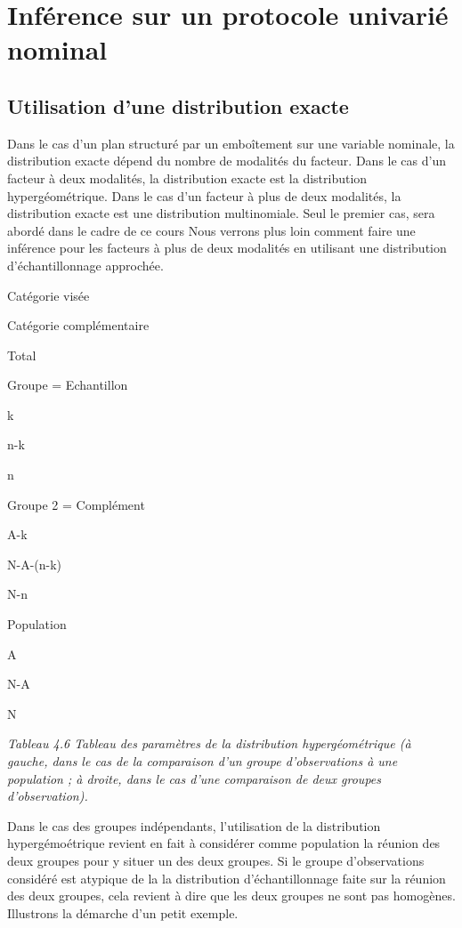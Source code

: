 \documentclass[]{book}
\theoremstyle{definition}
\theoremstyle{definition}
\theoremstyle{definition}
\theoremstyle{remark}
\begin{document}
\hypertarget{inference-sur-un-protocole-univarie-nominal-1}{%
\section{Inférence sur un protocole univarié
nominal}\label{inference-sur-un-protocole-univarie-nominal-1}}

\hypertarget{utilisation-dune-distribution-exacte-4}{%
\subsection{Utilisation d'une distribution
exacte}\label{utilisation-dune-distribution-exacte-4}}

Dans le cas d'un plan structuré par un emboîtement sur une variable
nominale, la distribution exacte dépend du nombre de modalités du
facteur. Dans le cas d'un facteur à deux modalités, la distribution
exacte est la distribution hypergéométrique. Dans le cas d'un facteur à
plus de deux modalités, la distribution exacte est une distribution
multinomiale. Seul le premier cas, sera abordé dans le cadre de ce cours
Nous verrons plus loin comment faire une inférence pour les facteurs à
plus de deux modalités en utilisant une distribution d'échantillonnage
approchée.

Catégorie visée

Catégorie complémentaire

Total

Groupe = Echantillon

k

n-k

n

Groupe 2 = Complément

A-k

N-A-(n-k)

N-n

Population

A

N-A

N

\emph{Tableau 4.6 Tableau des paramètres de la distribution
hypergéométrique (à gauche, dans le cas de la comparaison d'un groupe
d'observations à une population ; à droite, dans le cas d'une
comparaison de deux groupes d'observation).}

Dans le cas des groupes indépendants, l'utilisation de la distribution
hypergémoétrique revient en fait à considérer comme population la
réunion des deux groupes pour y situer un des deux groupes. Si le groupe
d'observations considéré est atypique de la la distribution
d'échantillonnage faite sur la réunion des deux groupes, cela revient à
dire que les deux groupes ne sont pas homogènes. Illustrons la démarche
d'un petit exemple.
\end{document}
